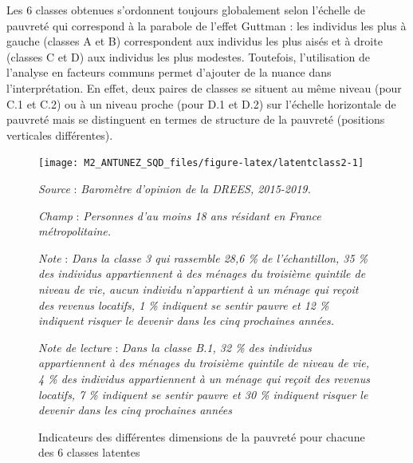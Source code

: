 \documentclass[12pt,a4paper]{reedthesis}
\begin{document}
Les 6 classes obtenues s'ordonnent toujours globalement selon l'échelle de pauvreté qui correspond à la parabole de l'effet Guttman : les individus les plus à gauche (classes A et B) correspondent aux individus les plus aisés et à droite (classes C et D) aux individus les plus modestes. Toutefois, l'utilisation de l'analyse en facteurs communs permet d'ajouter de la nuance dans l'interprétation. En effet, deux paires de classes se situent au même niveau (pour C.1 et C.2) ou à un niveau proche (pour D.1 et D.2) sur l'échelle horizontale de pauvreté mais se distinguent en termes de structure de la pauvreté (positions verticales différentes).
\begin{figure}[!ht]

{\centering \texttt{[image: M2\_ANTUNEZ\_SQD\_files/figure-latex/latentclass2-1]} 

}

\caption[Indicateurs des différentes dimensions de la pauvreté pour chacune des 6 classes latentes]{Indicateurs des différentes dimensions de la pauvreté pour chacune des 6 classes latentes}\label{fig:latentclass2}

\footnotesize


\emph{Source} : \emph{Baromètre d’opinion de la DREES, 2015-2019.}


\emph{Champ} : \emph{Personnes d’au moins 18 ans résidant en France métropolitaine.}


\emph{Note} : \emph{Dans la classe 3 qui rassemble 28,6 \% de l'échantillon, 35 \% des individus appartiennent à des ménages du troisième quintile de niveau de vie, aucun individu n’appartient à un ménage qui reçoit des revenus locatifs, 1 \% indiquent se sentir pauvre et 12 \% indiquent risquer le devenir dans les cinq prochaines années.}


\emph{Note de lecture} : \emph{Dans la classe B.1, 32 \% des individus appartiennent à des ménages du troisième quintile de niveau de vie, 4 \% des individus appartiennent à un ménage qui reçoit des revenus locatifs, 7 \% indiquent se sentir pauvre et 30 \% indiquent risquer le devenir dans les cinq prochaines années}
\normalsize\end{figure}
\end{document}
